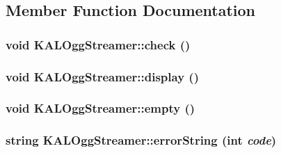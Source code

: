 \subsection{Member Function Documentation}
\hypertarget{class_k_a_l_ogg_streamer_599388d62822c02aff24c7367db983de}{
\subsubsection[{check}]{\setlength{\rightskip}{0pt plus 5cm}void KALOggStreamer::check ()}}
\label{class_k_a_l_ogg_streamer_599388d62822c02aff24c7367db983de}


\hypertarget{class_k_a_l_ogg_streamer_911c613e462ad7fa2c8d31e0f440427c}{
\subsubsection[{display}]{\setlength{\rightskip}{0pt plus 5cm}void KALOggStreamer::display ()}}
\label{class_k_a_l_ogg_streamer_911c613e462ad7fa2c8d31e0f440427c}


\hypertarget{class_k_a_l_ogg_streamer_835a0ca89543e3c977cf7c3a8228fca4}{
\subsubsection[{empty}]{\setlength{\rightskip}{0pt plus 5cm}void KALOggStreamer::empty ()}}
\label{class_k_a_l_ogg_streamer_835a0ca89543e3c977cf7c3a8228fca4}


\hypertarget{class_k_a_l_ogg_streamer_fee6d18eb74b3d4bf1654d58bc8e28c4}{
\subsubsection[{errorString}]{\setlength{\rightskip}{0pt plus 5cm}string KALOggStreamer::errorString (int {\em code})}}
\label{class_k_a_l_ogg_streamer_fee6d18eb74b3d4bf1654d58bc8e28c4}


